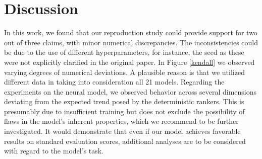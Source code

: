 \section{Discussion}
In this work, we found that our reproduction study could provide support for two out of three claims, with minor numerical discrepancies. The inconsistencies could be due to the use of different hyperparameters, for instance, the seed as these were not explicitly clarified in the original paper. In Figure \ref{kendall} we observed varying degrees of numerical deviations. A plausible reason is that we utilized different data in taking into consideration all 21 models. Regarding the experiments on the neural model, we observed behavior across several dimensions deviating from the expected trend posed by the deterministic rankers. This is presumably due to insufficient training but does not exclude the possibility of flaws in the model's inherent properties, which we recommend to be further investigated. It would demonstrate that even if our model achieves favorable results on standard evaluation scores, additional analyses are to be considered with regard to the model's task.  



